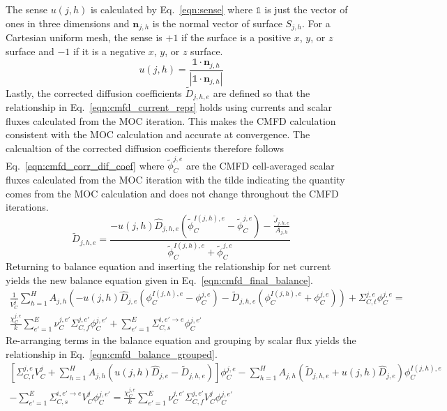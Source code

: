The sense $u(j,h)$ is calculated by Eq.~\ref{eqn:sense} where $\mathbb{1}$ is just the vector of ones in three dimensions and $\mathbf{n}_{j,h}$ is the normal vector of surface $S_{j,h}$. For a Cartesian uniform mesh, the sense is $+1$ if the surface is a positive $x$, $y$, or $z$ surface and $-1$ if it is a negative $x$, $y$, or $z$ surface.
\begin{equation}
u(j,h) = \frac{\mathbb{1} \cdot \mathbf{n}_{j,h}}{|\mathbb{1} \cdot \mathbf{n}_{j,h}|}
\label{eqn:sense}
\end{equation}
Lastly, the corrected diffusion coefficients $\tilde{D}_{j,h,e}$ are defined so that the relationship in Eq.~\ref{eqn:cmfd_current_repr} holds using currents and scalar fluxes calculated from the MOC iteration. This makes the CMFD calculation consistent with the MOC calculation and accurate at convergence. The calcualtion of the corrected diffusion coefficients therefore follows Eq.~\ref{eqn:cmfd_corr_dif_coef} where $\tilde{\phi}_C^{j,e}$ are the CMFD cell-averaged scalar fluxes calculated from the MOC iteration with the tilde indicating the quantity comes from the MOC calculation and does not change throughout the CMFD iterations.
\begin{equation}
	\tilde{D}_{j,h,e} = \frac{-u(j, h) \hat{D}_{j,h,e} \left(\tilde{\phi}_C^{I(j,h),e} - \tilde{\phi}_C^{j,e}\right) - \frac{\tilde{J}_{j,h,e}}{A_{j,h}}}{\tilde{\phi}_C^{I(j,h),e} + \tilde{\phi}_C^{j,e}}
	\label{eqn:cmfd_corr_dif_coef}
\end{equation}
Returning to balance equation and inserting the relationship for net current yields the new balance equation given in Eq.~\ref{eqn:cmfd_final_balance}.
\begin{equation}
\begin{split}
	\frac{1}{V_C^j} \sum_{h=1}^H A_{j,h} \left( - u(j, h) \hat{D}_{j,e} \left(\phi_C^{I(j,h),e} - \phi_C^{j,e}\right) - \tilde{D}_{j,h,e} \left(\phi_C^{I(j,h),e} + \phi_C^{j,e}\right) \right) + \Sigma_{C,t}^{j,e} \phi_C^{j,e} = \\
	\frac{\chi_C^{j,e}}{k} \sum_{e'=1}^{E} \nu_C^{j, e'} \Sigma_{C,f}^{j,e'} \phi_C^{j,e'} + \sum_{e'=1}^E  \Sigma_{C,s}^{i, e' \rightarrow e} \phi_C^{j,e'}
\end{split}
\end{equation}
Re-arranging terms in the balance equation and grouping by scalar flux yields the relationship in Eq.~\ref{eqn:cmfd_balance_grouped}.
\begin{equation}
	\begin{split}
		\left[\Sigma_{C,t}^{j,e} V_C^j + \sum_{h=1}^H A_{j,h} \left(u(j,h) \hat{D}_{j,e} - \tilde{D}_{j,h,e} \right) \right] \phi_C^{j,e} - \sum_{h=1}^H A_{j,h} \left( \tilde{D}_{j,h,e} + u(j,h) \hat{D}_{j,e} \right) \phi_C^{I(j,h),e} & \\ - \sum_{e'=1}^E  \Sigma_{C,s}^{i, e' \rightarrow e} V_C^j \phi_C^{j,e'} =
		\frac{\chi_C^{j,e}}{k} \sum_{e'=1}^{E} \nu_C^{j, e'} \Sigma_{C,f}^{j,e'} V_C^j \phi_C^{j,e'} & \\
	\end{split}
	\label{eqn:cmfd_balance_grouped}
\end{equation}
